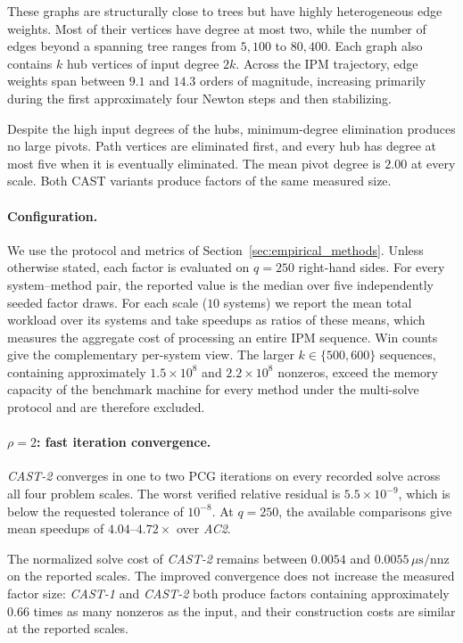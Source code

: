 \documentclass{article}
\newcommand{\CASTone}{\textit{CAST-1}\xspace}
\newcommand{\CASTtwo}{\textit{CAST-2}\xspace}
\newcommand{\ACtwo}{\textit{AC2}\xspace}
\newcommand{\1}{\mathbbm{1}}
\theoremstyle{plain}
\begin{document}
These graphs are structurally close to trees but have highly
heterogeneous edge weights. Most of their vertices have
degree at most two, while the number of edges beyond a spanning tree
ranges from $5{,}100$ to $80{,}400$. Each graph also contains $k$
hub vertices of input degree $2k$. Across the IPM trajectory, edge
weights span between $9.1$ and $14.3$ orders of magnitude, increasing primarily during the first approximately four Newton steps and then
stabilizing.

Despite the high input degrees of the hubs, minimum-degree elimination produces no large pivots. Path vertices are eliminated first, and every hub has degree at most five when it is eventually eliminated. The mean pivot degree is $2.00$ at every scale. Both CAST variants produce factors of the same measured size.

\paragraph{Configuration.}
We use the protocol and metrics of
Section~\ref{sec:empirical_methods}. Unless otherwise stated, each
factor is evaluated on $q=250$ right-hand sides. For every
system--method pair, the reported value is the median over five
independently seeded factor draws. For each scale ($10$ systems) we report the mean total workload over its systems
and take speedups as ratios of these means, which measures the
aggregate cost of processing an entire IPM sequence. Win counts give
the complementary per-system view. The larger $k\in\{500,600\}$ sequences, containing approximately
$1.5\times10^{8}$ and $2.2\times10^{8}$ nonzeros, exceed the memory
capacity of the benchmark machine for every method under the
multi-solve protocol and are therefore excluded. 




\paragraph{$\rho=2$: fast iteration convergence.}
\CASTtwo converges in one to two PCG iterations on every recorded
solve across all four problem scales. The worst  verified
relative residual is $5.5\times10^{-9}$, which is below the requested
tolerance of $10^{-8}$. At $q=250$, the
available comparisons give mean speedups of
$4.04$--$4.72\times$ over \ACtwo.

The normalized solve cost of \CASTtwo remains between $0.0054$ and
$0.0055\,\mu\mathrm{s}/\mathrm{nnz}$ on the reported scales. The
improved convergence does not increase the measured factor size:
\CASTone and \CASTtwo both produce factors containing approximately
$0.66$ times as many nonzeros as the input, and their construction
costs are similar at the reported scales. 
\end{document}
